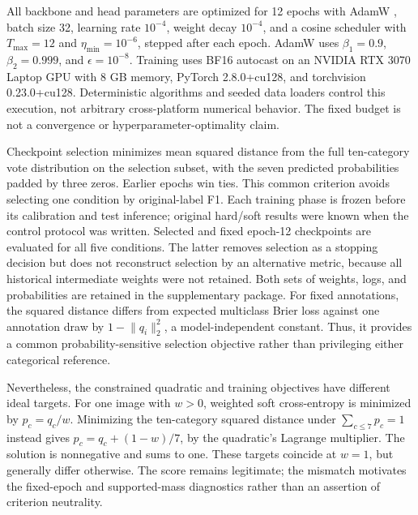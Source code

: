 \documentclass[pdflatex,sn-mathphys-num]{sn-jnl}
\begin{document}
All backbone and head parameters are optimized for 12 epochs with AdamW \cite{loshchilov2019adamw}, batch size 32, learning rate $10^{-4}$, weight decay $10^{-4}$, and a cosine scheduler with $T_{\max}=12$ and $\eta_{\min}=10^{-6}$, stepped after each epoch. AdamW uses $\beta_1=0.9$, $\beta_2=0.999$, and $\epsilon=10^{-8}$. Training uses BF16 autocast on an NVIDIA RTX 3070 Laptop GPU with 8 GB memory, PyTorch 2.8.0+cu128, and torchvision 0.23.0+cu128. Deterministic algorithms and seeded data loaders control this execution, not arbitrary cross-platform numerical behavior. The fixed budget is not a convergence or hyperparameter-optimality claim.

Checkpoint selection minimizes mean squared distance from the full ten-category vote distribution on the selection subset, with the seven predicted probabilities padded by three zeros. Earlier epochs win ties. This common criterion avoids selecting one condition by original-label F1. Each training phase is frozen before its calibration and test inference; original hard/soft results were known when the control protocol was written. Selected and fixed epoch-12 checkpoints are evaluated for all five conditions. The latter removes selection as a stopping decision but does not reconstruct selection by an alternative metric, because all historical intermediate weights were not retained. Both sets of weights, logs, and probabilities are retained in the supplementary package.
For fixed annotations, the squared distance differs from expected multiclass Brier loss against one annotation draw by $1-\lVert q_i\rVert_2^2$, a model-independent constant. Thus, it provides a common probability-sensitive selection objective rather than privileging either categorical reference.

Nevertheless, the constrained quadratic and training objectives have different ideal targets. For one image with $w>0$, weighted soft cross-entropy is minimized by $p_c=q_c/w$. Minimizing the ten-category squared distance under $\sum_{c\leq7}p_c=1$ instead gives $p_c=q_c+(1-w)/7$, by the quadratic's Lagrange multiplier. The solution is nonnegative and sums to one. These targets coincide at $w=1$, but generally differ otherwise. The score remains legitimate; the mismatch motivates the fixed-epoch and supported-mass diagnostics rather than an assertion of criterion neutrality.
\end{document}
